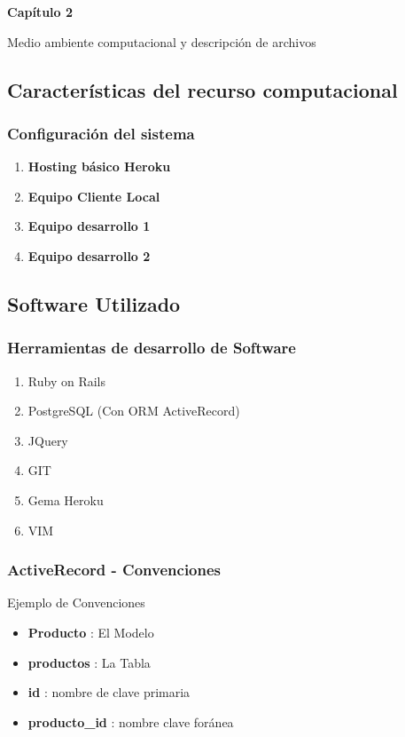 \documentclass{beamer}
\begin{document}
\begin{frame}
\textbf{Capítulo 2}

\mbox{}

Medio ambiente computacional y descripción de archivos
\end{frame}

\subsection{Características del recurso computacional}

\begin{frame}
\frametitle{Configuración del sistema}

\begin{enumerate}
\item \textbf{Hosting básico Heroku}

\item \textbf{Equipo Cliente Local}

\item \textbf{Equipo desarrollo 1}

\item \textbf{Equipo desarrollo 2}
\end{enumerate}

\end{frame}

\subsection{Software Utilizado}

\begin{frame}
\frametitle{Herramientas de desarrollo de Software}
\begin{enumerate}
\pause
\item \alert{Ruby on Rails} \pause
\item \alert{PostgreSQL (Con ORM ActiveRecord)} \pause
\item JQuery
\item GIT
\item Gema Heroku
\item VIM
\end{enumerate}
\end{frame}

\begin{frame}
\frametitle{ActiveRecord - Convenciones}
Ejemplo de Convenciones
\begin{itemize}
\item \textbf{Producto} : El Modelo
\item \textbf{productos} : La Tabla
\item \textbf{id} : nombre de clave primaria
\item \textbf{producto\_id} : nombre clave foránea
\end{itemize}
\end{frame}
\end{document}
